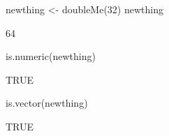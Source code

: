 \begin{Schunk}
\begin{Sinput}
 newthing <- doubleMe(32)
 newthing
\end{Sinput}
\begin{Soutput}
[1] 64
\end{Soutput}
\begin{Sinput}
 is.numeric(newthing)
\end{Sinput}
\begin{Soutput}
[1] TRUE
\end{Soutput}
\begin{Sinput}
 is.vector(newthing)
\end{Sinput}
\begin{Soutput}
[1] TRUE
\end{Soutput}
\end{Schunk}
